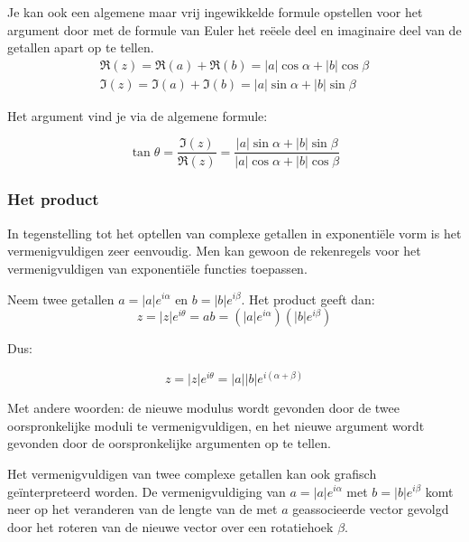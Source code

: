 Je kan ook een algemene maar vrij ingewikkelde formule opstellen voor het argument door met de formule van Euler het re\"{e}ele deel en imaginaire deel van de getallen apart op te tellen.\\

\[  \begin{array}{l}  
\Re(z)=\Re(a)+\Re(b)=|a|\cos \alpha + |b|\cos \beta \\
\Im(z)=\Im(a)+\Im(b)=|a|\sin \alpha + |b|\sin \beta  \end{array} \] 

Het argument vind je via de algemene formule:\\

\begin{framed}
	\[ \tan \theta =\frac{\Im(z)}{\Re(z)}=\frac{|a|\sin \alpha + |b|\sin \beta}{|a|\cos \alpha + |b|\cos \beta}   \]
\end{framed}

\subsubsection{Het product}

In tegenstelling tot het optellen van complexe getallen in exponenti\"{e}le vorm is het vermenigvuldigen zeer eenvoudig. Men kan gewoon de rekenregels voor het vermenigvuldigen van exponenti\"{e}le functies toepassen.\\

\vspace{0.2cm}

Neem twee getallen $a=|a|e^{i\alpha}$ en $b=|b|e^{i \beta}$. Het product geeft dan:\\

\[  z=|z|e^{i \theta}=ab=(|a|e^{i\alpha})(|b|e^{i \beta})  \]

Dus:\\

\begin{framed}
	\[ z=|z|e^{i \theta}=|a||b|e^{i (\alpha + \beta)}       \]
\end{framed}

Met andere woorden: de nieuwe modulus wordt gevonden door de twee oorspronkelijke moduli te vermenigvuldigen, en het nieuwe argument wordt gevonden door de oorspronkelijke argumenten op te tellen.\\

\vspace{0.2cm}

Het vermenigvuldigen van twee complexe getallen kan ook grafisch ge\"{i}nterpreteerd worden. De vermenigvuldiging van $a=|a|e^{i\alpha}$ met $b=|b|e^{i\beta}$ komt neer op het veranderen van de lengte van de met $a$ geassocieerde vector gevolgd door het roteren van de nieuwe vector over een rotatiehoek $\beta$.\\


